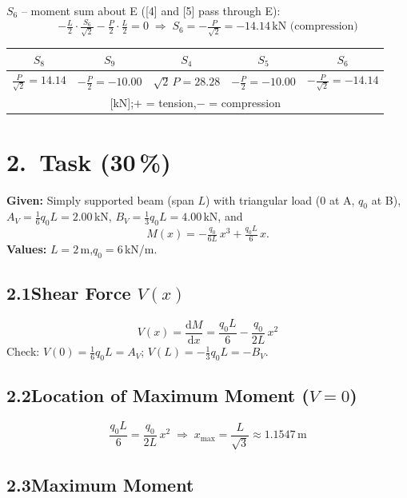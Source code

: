 \documentclass[a4paper,11pt]{article}
\begin{document}
\textbf{$S_6$} -- moment sum about E ([4] and [5] pass through E):
\[
  -\tfrac{L}{2}\cdot\tfrac{S_6}{\sqrt{2}} - \tfrac{P}{2}\cdot\tfrac{L}{2} = 0
  \;\Rightarrow\; \boxed{S_6 = -\tfrac{P}{\sqrt{2}} = -14.14\,\text{kN (compression)}}
\]

\medskip
\begin{center}
\begin{tabular}{ccccc}
\toprule
$S_8$ & $S_9$ & $S_4$ & $S_5$ & $S_6$ \\
\midrule
$\tfrac{P}{\sqrt{2}} = 14.14$ & $-\tfrac{P}{2} = -10.00$ &
$\sqrt{2}\,P = 28.28$ & $-\tfrac{P}{2} = -10.00$ & $-\tfrac{P}{\sqrt{2}} = -14.14$ \\
\multicolumn{5}{c}{\small [kN];\quad $+$ = tension,\quad $-$ = compression} \\
\bottomrule
\end{tabular}
\end{center}

\newpage
\section*{2.~Task \hfill (30\,\%)}

\textbf{Given:} Simply supported beam (span $L$) with triangular load
(0 at A, $q_0$ at B),
$A_V = \tfrac{1}{6}q_0 L = 2.00$\,kN,
$B_V = \tfrac{1}{3}q_0 L = 4.00$\,kN, and
\[
  M(x) = -\tfrac{q_0}{6L}\,x^3 + \tfrac{q_0 L}{6}\,x.
\]
\textbf{Values:} $L = 2$\,m,\quad $q_0 = 6$\,kN/m.

\subsection*{2.1\quad Shear Force $V(x)$}

\[
  V(x) = \frac{\mathrm{d}M}{\mathrm{d}x}
        = \frac{q_0 L}{6} - \frac{q_0}{2L}\,x^2
\]
Check: $V(0) = \tfrac{1}{6}q_0 L = A_V$\;\checkmark;\quad
$V(L) = -\tfrac{1}{3}q_0 L = -B_V$\;\checkmark.

\subsection*{2.2\quad Location of Maximum Moment ($V = 0$)}

\[
  \frac{q_0 L}{6} = \frac{q_0}{2L}\,x^2
  \;\Rightarrow\; \boxed{x_{\max} = \frac{L}{\sqrt{3}} \approx 1.1547\,\text{m}}
\]

\subsection*{2.3\quad Maximum Moment}
\end{document}
